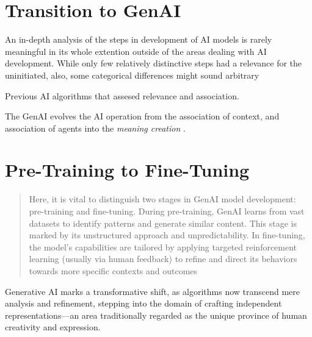 \section{Transition to GenAI}\label{sec:Transition to GenAI} %

An in-depth analysis of the steps in development of AI models is rarely
meaningful in its whole extention outside of the areas dealing with AI development.
While only few relatively distinctive steps had a relevance for the
uninitiated, also, some categorical differences might sound arbitrary

Previous AI algorithms that assesed relevance and association.

The GenAI evolves the AI operation from the association of context, and
association of agents into the \emph{meaning creation}
\parencite[964]{dishon2024}.

\section{Pre-Training to Fine-Tuning}\label{sec:Pre-Training} %

\begin{quote}
	Here, it is vital to distinguish two stages in GenAI model development: pre-training and fine-tuning. During pre-training, GenAI learns from vast datasets to identify patterns and generate similar content. This stage is marked by its unstructured approach and unpredictability. In fine-tuning, the model’s capabilities are tailored by applying targeted reinforcement learning (usually via human feedback) to refine and direct its behaviors towards more specific contexts and outcomes \parencite[964]{dishon2024}
\end{quote}



Generative AI marks a transformative shift, as algorithms now transcend mere analysis and refinement, stepping into the domain of crafting independent representations—an area traditionally regarded as the unique province of human creativity and expression.

